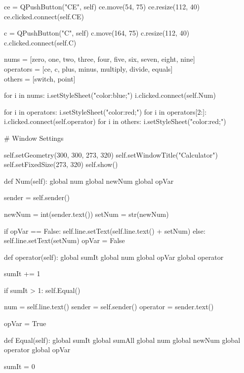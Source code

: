         ce = QPushButton("CE", self)
        ce.move(54, 75)
        ce.resize(112, 40)
        ce.clicked.connect(self.CE)

        c = QPushButton("C", self)
        c.move(164, 75)
        c.resize(112, 40)
        c.clicked.connect(self.C)


        nums = [zero, one, two, three, four, five, six, seven, eight, nine]\\

        operators = [ce, c, plus, minus, multiply, divide, equals]\\

        others = [switch, point]

        for i in nums:
            i.setStyleSheet("color:blue;")
            i.clicked.connect(self.Num)

        for i in operators:
            i.setStyleSheet("color:red;")
        for i in operators[2:]:
            i.clicked.connect(self.operator)
        for i in others:
            i.setStyleSheet("color:red;")

        # Window Settings

        self.setGeometry(300, 300, 273, 320)
        self.setWindowTitle("Calculator")
        self.setFixedSize(273, 320)
        self.show()

    def Num(self):
        global num
        global newNum
        global opVar

        sender = self.sender()

        newNum = int(sender.text())
        setNum = str(newNum)

        if opVar == False:
            self.line.setText(self.line.text() + setNum)
        else:
            self.line.setText(setNum)
            opVar = False

    def operator(self):
        global sumIt
        global num
        global opVar
        global operator

        sumIt += 1

        if sumIt > 1:
            self.Equal()

        num = self.line.text()
        sender = self.sender()
        operator = sender.text()

        opVar = True

    def Equal(self):
        global sumIt
        global sumAll
        global num
        global newNum
        global operator
        global opVar

        sumIt = 0

